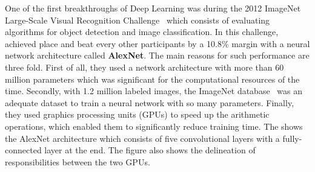One of the first breakthroughs of Deep Learning was during the 2012 ImageNet Large-Scale Visual Recognition Challenge~\cite{ILSVRC15} which consists of evaluating algorithms for object detection and image classification.
In this challenge, \citet{krizhevsky2012imagenet} achieved  place and beat every other participants by a 10.8\% margin with a neural network architecture called \textbf{AlexNet}. 
The main reasons for such performance are three fold.
First of all, they used a network architecture with more than 60 million parameters which was significant for the computational resources of the time.
Secondly, with 1.2 million labeled images, the ImageNet database~\cite{deng2009imagenet} was an adequate dataset to train a neural network with so many parameters.
Finally, they used graphics processing units (GPUs) to speed up the arithmetic operations, which enabled them to significantly reduce training time.
The  shows the AlexNet architecture which consists of five convolutional layers with a fully-connected layer at the end.
The figure also shows the delineation of responsibilities between the two GPUs.


